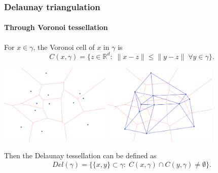 \documentclass[c, 10pt]{beamer}
\begin{document}
\begin{frame}\frametitle{Delaunay triangulation}\framesubtitle{Through Voronoi tessellation}

For $x \in \gamma$, the \alert{Voronoi cell} of $x$ in $\gamma$ is
$$C(x,\gamma) = \{z \in \mathbb R^d:\; \|x-z\| \leq \|y-z\| \; \forall y \in \gamma \}.$$
\begin{centering}\includegraphics[height = 3.8cm]{./FigureLayout/Voronoi.png}
\includegraphics[height = 3.8cm]{./FigureLayout/VoronoiDel.png}\end{centering}

Then the Delaunay tessellation can be defined as 
$$Del(\gamma) = \{ \{x,y\} \subset \gamma: \; C(x,\gamma)\cap C(y,\gamma) \neq \emptyset \}.$$
\end{frame}
\end{document}

